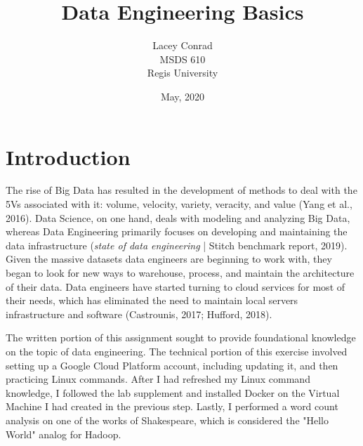 \documentclass[]{article}
\title{Data Engineering Basics}
\author{Lacey Conrad\\MSDS 610\\ Regis University}
\date{May, 2020}
\begin{document}
	\maketitle
	
\section{Introduction}
The rise of Big Data has resulted in the development of methods to deal with the 5Vs associated with it: volume, velocity, variety, veracity, and value (Yang et al., 2016).  Data Science, on one hand, deals with modeling and analyzing Big Data, whereas Data Engineering primarily focuses on developing and maintaining the data infrastructure (\textit{state of data engineering} | Stitch benchmark report, 2019).  Given the massive datasets data engineers are beginning to work with, they began to look for new ways to warehouse, process, and maintain the architecture of their data.  Data engineers have started turning to cloud services for most of their needs, which has eliminated the need to maintain local servers infrastructure and software (Castrounis, 2017; Hufford, 2018).  

The written portion of this assignment sought to provide foundational knowledge on the topic of data engineering. The technical portion of this exercise involved setting up a Google Cloud Platform account, including updating it, and then practicing Linux commands.  After I had refreshed my Linux command knowledge, I followed the lab supplement and installed Docker on the Virtual Machine I had created in the previous step.  Lastly, I performed a word count analysis on one of the works of Shakespeare, which is considered the "Hello World" analog for Hadoop.  
\end{document}

